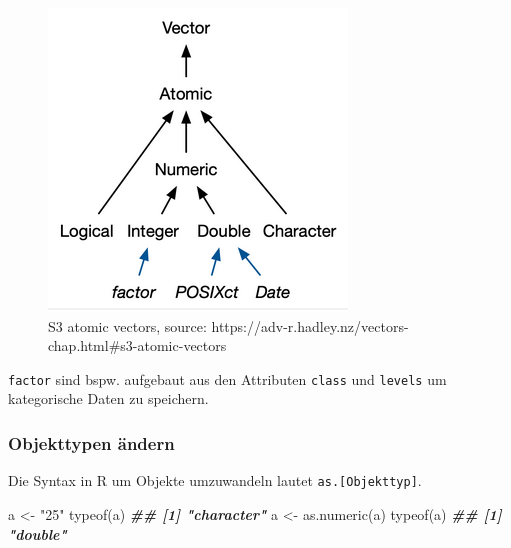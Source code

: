\documentclass[
]{article}
\newenvironment{Shaded}{\begin{snugshade}}{\end{snugshade}}
\newcommand{\DocumentationTok}[1]{\textcolor[rgb]{0.56,0.35,0.01}{\textbf{\textit{#1}}}}
\newcommand{\FunctionTok}[1]{\textcolor[rgb]{0.00,0.00,0.00}{#1}}
\newcommand{\NormalTok}[1]{#1}
\newcommand{\OtherTok}[1]{\textcolor[rgb]{0.56,0.35,0.01}{#1}}
\newcommand{\StringTok}[1]{\textcolor[rgb]{0.31,0.60,0.02}{#1}}
\begin{document}
\begin{figure}

{\centering \includegraphics[width=1\linewidth]{images/080} 

}

\caption{S3 atomic vectors, source: https://adv-r.hadley.nz/vectors-chap.html#s3-atomic-vectors}\label{fig:unnamed-chunk-50}
\end{figure}

\texttt{factor} sind bspw. aufgebaut aus den Attributen \texttt{class} und \texttt{levels} um kategorische Daten zu speichern.

\hypertarget{objekttypen-uxe4ndern}{%
\subsubsection{Objekttypen ändern}\label{objekttypen-uxe4ndern}}

Die Syntax in R um Objekte umzuwandeln lautet \texttt{as.{[}Objekttyp{]}}.

\begin{Shaded}
\begin{Highlighting}[]
\NormalTok{a }\OtherTok{\textless{}{-}} \StringTok{"25"}
\FunctionTok{typeof}\NormalTok{(a)}
\DocumentationTok{\#\# [1] "character"}
\NormalTok{a }\OtherTok{\textless{}{-}} \FunctionTok{as.numeric}\NormalTok{(a)}
\FunctionTok{typeof}\NormalTok{(a)}
\DocumentationTok{\#\# [1] "double"}
\end{Highlighting}
\end{Shaded}
\end{document}
